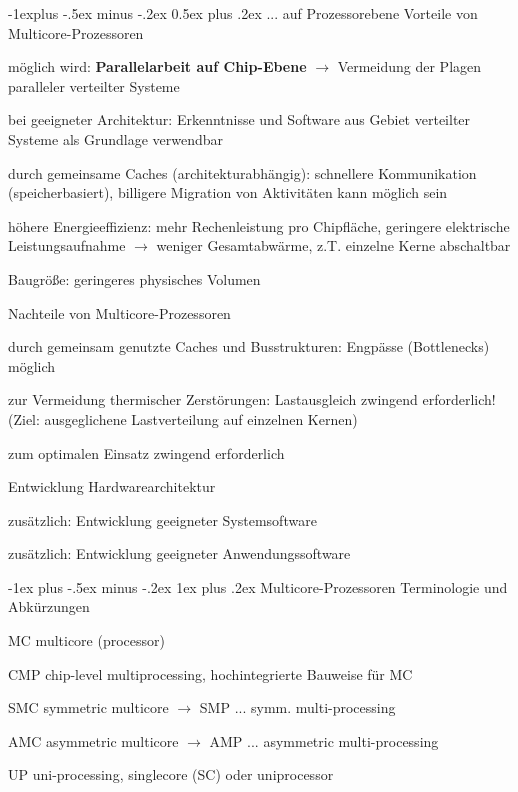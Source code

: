 \documentclass[a4paper]{article}
\makeatletter
\renewcommand{\subsection}{\@startsection{subsection}{2}{0mm}%
 {-1explus -.5ex minus -.2ex}%
 {0.5ex plus .2ex}%
 {\normalfont\normalsize\bfseries}}
\renewcommand{\subsubsection}{\@startsection{subsubsection}{3}{0mm}%
 {-1ex plus -.5ex minus -.2ex}%
 {1ex plus .2ex}%
 {\normalfont\small\bfseries}}
\makeatother
\begin{document}
\begin{multicols}{3}
    \subsection{... auf Prozessorebene}
    Vorteile von Multicore-Prozessoren
    \begin{enumerate*}
        \item möglich wird: \textbf{Parallelarbeit auf Chip-Ebene} $\rightarrow$ Vermeidung der Plagen paralleler verteilter Systeme
        \item bei geeigneter Architektur: Erkenntnisse und Software aus Gebiet verteilter Systeme als Grundlage verwendbar
        \item durch gemeinsame Caches (architekturabhängig): schnellere Kommunikation (speicherbasiert), billigere Migration von Aktivitäten kann möglich sein
        \item höhere Energieeffizienz: mehr Rechenleistung pro Chipfläche, geringere elektrische Leistungsaufnahme $\rightarrow$ weniger Gesamtabwärme, z.T. einzelne Kerne abschaltbar
        \item Baugröße: geringeres physisches Volumen
    \end{enumerate*}

    Nachteile von Multicore-Prozessoren
    \begin{enumerate*}
        \item durch gemeinsam genutzte Caches und Busstrukturen: Engpässe (Bottlenecks) möglich
        \item zur Vermeidung thermischer Zerstörungen: Lastausgleich zwingend erforderlich! (Ziel: ausgeglichene Lastverteilung auf einzelnen Kernen)
    \end{enumerate*}

    zum optimalen Einsatz zwingend erforderlich
    \begin{enumerate*}
        \item Entwicklung Hardwarearchitektur
        \item zusätzlich: Entwicklung geeigneter Systemsoftware
        \item zusätzlich: Entwicklung geeigneter Anwendungssoftware
    \end{enumerate*}

    \subsubsection{Multicore-Prozessoren}
    Terminologie und Abkürzungen
    \begin{description*}
        \item[MC] multicore (processor)
        \item[CMP] chip-level multiprocessing, hochintegrierte Bauweise für MC
        \item[SMC] symmetric multicore $\rightarrow$ SMP ... symm. multi-processing
        \item[AMC] asymmetric multicore $\rightarrow$ AMP ... asymmetric multi-processing
        \item[UP] uni-processing, singlecore (SC) oder uniprocessor
    \end{description*}


\end{multicols}
\end{document}
